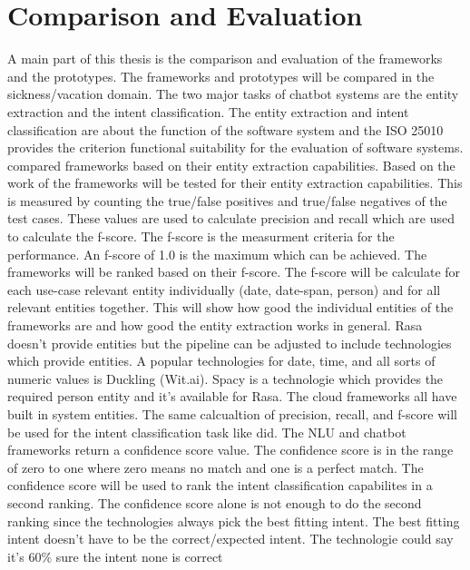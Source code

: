\section{Comparison and Evaluation}
A main part of this thesis is the comparison and evaluation of the 
frameworks and the prototypes.
The frameworks and prototypes will be compared in the sickness/vacation domain.
The two major tasks of chatbot systems are the entity extraction and the intent 
classification.
The entity extraction and intent classification are about the function of the 
software system and the ISO 25010\cite{iso25010} provides  the criterion functional 
suitability for the evaluation of software systems.
\citet{geyer2016named} compared frameworks based on their entity extraction
capabilities.
Based on the work of \citet{geyer2016named} the frameworks will be tested 
for their entity extraction capabilities.
This is measured by counting the true/false positives and true/false negatives of the test cases.
These  values are used to calculate precision and recall which 
are used to calculate the f-score.
The f-score is the measurment criteria for the performance.
An f-score of 1.0 is the maximum which can be achieved.
The frameworks will be ranked based on their f-score.
The f-score will be calculate for each use-case relevant entity 
individually (date, date-span, person) and for all relevant entities
together.
This will show how good the individual entities of the frameworks are 
and how good the entity extraction works in general.
Rasa doesn't provide entities but the pipeline can be 
adjusted to include technologies which provide entities.
A popular technologies for date, time, and all sorts of 
numeric values is Duckling (Wit.ai).
Spacy is a technologie which provides the required person entity and 
it's available for Rasa.
The cloud frameworks all have built in system entities. 
The same calcualtion of precision, recall, and f-score will be used for the intent 
classification task like \citet{braunEvaluatingNLU} did.
The NLU and chatbot frameworks return a confidence score value.
The confidence score is in the range of zero to one where zero 
means no match and one is a perfect match.
The confidence score will be used to rank the intent classification 
capabilites in a second ranking.
The confidence score alone is not enough to do the second ranking 
since the technologies always pick the best fitting intent.
The best fitting intent doesn't have to be the correct/expected intent.
The technologie could say it's 60\% sure the intent none is correct 
